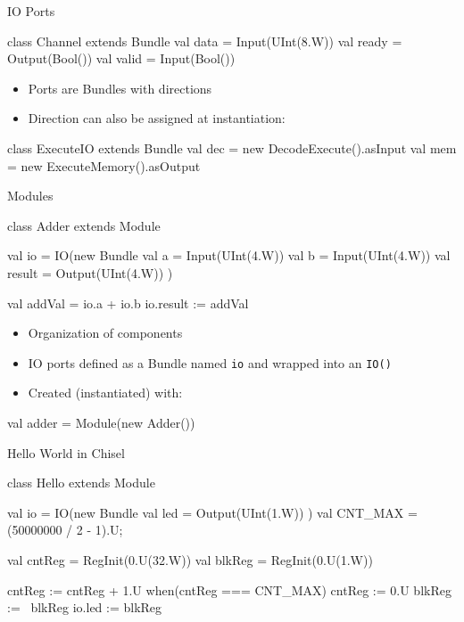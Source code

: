 \documentclass[xcolor=pdflatex,dvipsnames,table]{beamer}
\newcommand{\code}[1]{{\texttt{#1}}}
\begin{document}
\begin{frame}[fragile]{IO Ports}
\begin{chisel}
class Channel extends Bundle {
  val data = Input(UInt(8.W))
  val ready = Output(Bool())
  val valid = Input(Bool())
}
\end{chisel}
\begin{itemize}
\item Ports are Bundles with directions
\item Direction can also be assigned at instantiation:
\end{itemize}
\begin{chisel}
class ExecuteIO extends Bundle {
  val dec = new DecodeExecute().asInput
  val mem = new ExecuteMemory().asOutput
}
\end{chisel}
\end{frame}

\begin{frame}[fragile]{Modules}
\begin{chisel}
class Adder extends Module {
  val io = IO(new Bundle {
    val a = Input(UInt(4.W))
    val b = Input(UInt(4.W))
    val result = Output(UInt(4.W))
  })

  val addVal = io.a + io.b
  io.result := addVal
}
\end{chisel}
\begin{itemize}
\item Organization of components
\item IO ports defined as a Bundle named \code{io} and wrapped into an \code{IO()}
\item Created (instantiated) with:
\end{itemize}
\begin{chisel}
val adder = Module(new Adder())
\end{chisel}
\end{frame}

\begin{frame}[fragile]{Hello World in Chisel}
\begin{chisel}
class Hello extends Module {
  val io = IO(new Bundle {
    val led = Output(UInt(1.W))
  })
  val CNT_MAX = (50000000 / 2 - 1).U;
  
  val cntReg = RegInit(0.U(32.W))
  val blkReg = RegInit(0.U(1.W))

  cntReg := cntReg + 1.U
  when(cntReg === CNT_MAX) {
    cntReg := 0.U
    blkReg := ~blkReg
  }
  io.led := blkReg
}
\end{chisel}
\end{frame}
\end{document}
